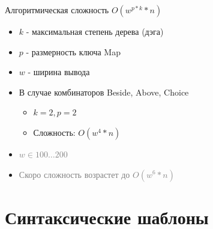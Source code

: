 \documentclass[sans]{beamer}
\begin{document}
\begin{frame}{Алгоритмическая сложность}
  $O(w^{p * k} * n)$
  \begin{itemize}
    \item $k$ - максимальная степень дерева (дэга)
    \item $p$ - размерность ключа Map
    \item $w$ - ширина вывода
    \item В случае комбинаторов Beside, Above, Choice
    \begin{itemize}
      \item $k = 2, p = 2$
      \item Сложность: $O(w^4 * n)$ 
    \end{itemize}

    \item \textcolor{gray}{$w \in 100\dots200$}
    \item \textcolor{gray}{Скоро сложность возрастет до $O(w ^ 6 * n)$ }
 
  \end{itemize}
\end{frame}

\section{Синтаксические шаблоны}
\end{document}
